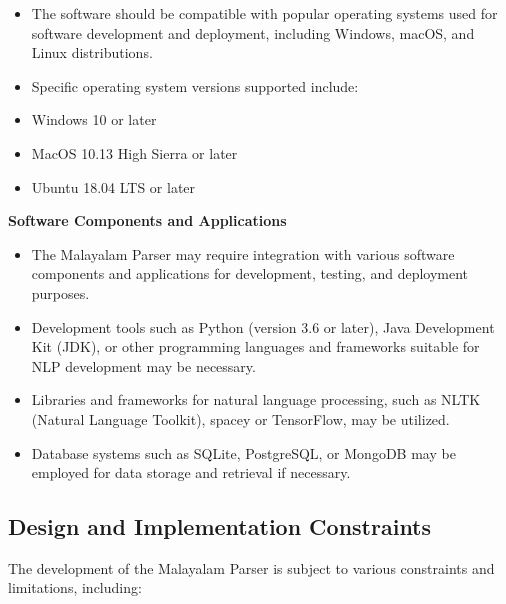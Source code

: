 \documentclass[12pt]{article}
\begin{document}
	\begin{itemize}[label=-]
		\item The software should be compatible with popular operating systems used for
		software development and deployment, including Windows, macOS, and Linux
		distributions.
		\item Specific operating system versions supported include:
		\item Windows 10 or later
		\item MacOS 10.13 High Sierra or later
		\item Ubuntu 18.04 LTS or later
	\end{itemize}
	
	\textbf{Software Components and Applications}
	
	\begin{itemize}[label=-]
		\item The Malayalam Parser may require integration with various software components and applications for development, testing, and deployment purposes.
		\item Development tools such as Python (version 3.6 or later), Java Development Kit (JDK), or other programming languages and frameworks suitable for NLP development may be necessary.
		\item Libraries and frameworks for natural language processing, such as NLTK (Natural Language Toolkit), spacey or TensorFlow, may be utilized.
		\item Database systems such as SQLite, PostgreSQL, or MongoDB may be employed for data storage and retrieval if necessary.
	\end{itemize}
	
	\subsection{Design and Implementation Constraints}
	The development of the Malayalam Parser is subject to various constraints and limitations, including:
	
\end{document}
